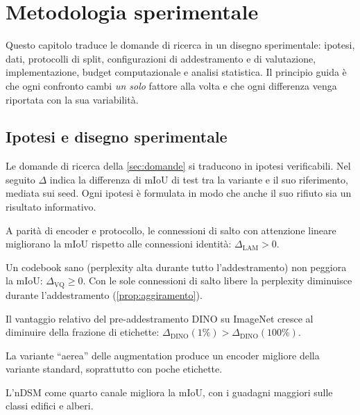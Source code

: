 \chapter{Metodologia sperimentale}
\label{cap:metodologia}

Questo capitolo traduce le domande di ricerca in un disegno sperimentale: ipotesi, dati,
protocolli di split, configurazioni di addestramento e di valutazione, implementazione, budget
computazionale e analisi statistica. Il principio guida è che ogni confronto cambi \emph{un solo}
fattore alla volta e che ogni differenza venga riportata con la sua variabilità.

\section{Ipotesi e disegno sperimentale}
\label{sec:disegno}

Le domande di ricerca della \cref{sec:domande} si traducono in ipotesi verificabili. Nel seguito
$\Delta$ indica la differenza di mIoU di test tra la variante e il suo riferimento, mediata sui
seed. Ogni ipotesi è formulata in modo che anche il suo rifiuto sia un risultato informativo.

\begin{ipotesi}[\RQ{1}]\label{ip:lam}
A parità di encoder e protocollo, le connessioni di salto con attenzione lineare migliorano la
mIoU rispetto alle connessioni identità: $\Delta_{\mathrm{LAM}}>0$.
\end{ipotesi}
\begin{ipotesi}[\RQ{2}]\label{ip:vq}
Un codebook sano (perplexity alta durante tutto l'addestramento) non peggiora la mIoU:
$\Delta_{\mathrm{VQ}}\ge0$. Con le sole connessioni di salto libere la perplexity diminuisce
durante l'addestramento (\cref{prop:aggiramento}).
\end{ipotesi}
\begin{ipotesi}[\RQ{3}]\label{ip:dino}
Il vantaggio relativo del pre-addestramento DINO su ImageNet cresce al diminuire della frazione
di etichette: $\Delta_{\mathrm{DINO}}(1\%)>\Delta_{\mathrm{DINO}}(100\%)$.
\end{ipotesi}
\begin{ipotesi}[\RQ{4}]\label{ip:aug}
La variante \enquote{aerea} delle augmentation produce un encoder migliore della variante
standard, soprattutto con poche etichette.
\end{ipotesi}
\begin{ipotesi}[\RQ{6}]\label{ip:ndsm}
L'nDSM come quarto canale migliora la mIoU, con i guadagni maggiori sulle classi edifici e alberi.
\end{ipotesi}

